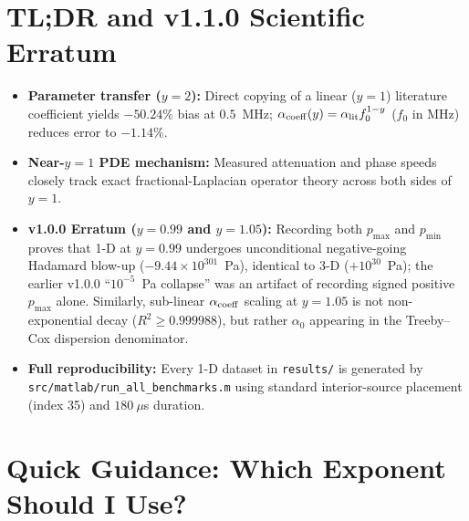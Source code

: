 \documentclass[11pt]{article}
\begin{document}
\section*{TL;DR and v1.1.0 Scientific Erratum}
\begin{itemize}
\item \textbf{Parameter transfer ($y=2$):} Direct copying of a linear ($y=1$) literature coefficient yields $-50.24\%$ bias at $0.5$~MHz; $\alpha_{\rm coeff}(y)=\alpha_{\rm lit}f_0^{1-y}$ ($f_0$ in MHz) reduces error to $-1.14\%$.
\item \textbf{Near-$y=1$ PDE mechanism:} Measured attenuation and phase speeds closely track exact fractional-Laplacian operator theory across both sides of $y=1$.
\item \textbf{v1.0.0 Erratum ($y=0.99$ and $y=1.05$):} Recording both $p_{\max}$ and $p_{\min}$ proves that 1-D at $y=0.99$ undergoes unconditional negative-going Hadamard blow-up ($-9.44\times 10^{301}$~Pa), identical to 3-D ($+10^{30}$~Pa); the earlier v1.0.0 ``$10^{-5}$~Pa collapse'' was an artifact of recording signed positive $p_{\max}$ alone. Similarly, sub-linear $\alpha_{\rm coeff}$ scaling at $y=1.05$ is not non-exponential decay ($R^2 \ge 0.999988$), but rather $\alpha_0$ appearing in the Treeby--Cox dispersion denominator.
\item \textbf{Full reproducibility:} Every 1-D dataset in \texttt{results/} is generated by \texttt{src/matlab/run\_all\_benchmarks.m} using standard interior-source placement (index 35) and $180~\mu$s duration.
\end{itemize}
\tableofcontents
\clearpage

\section{Quick Guidance: Which Exponent Should I Use?}
\begin{table}[H]
\centering
\caption{Decision matrix across k-Wave attenuation routes ($f_0 = 0.5$~MHz, $c_0 = 3100$~m/s).}
\end{table}
\end{document}

